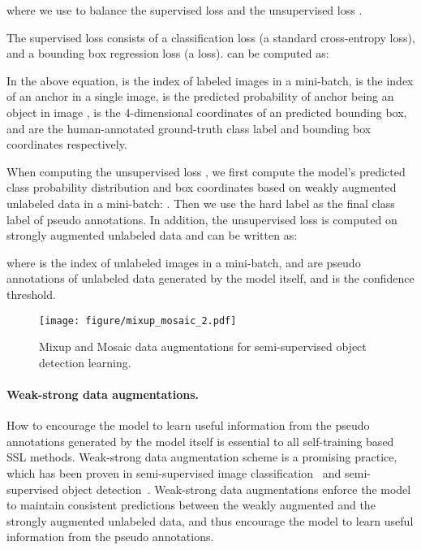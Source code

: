 \documentclass[final]{cvpr}
\begin{document}
where we use  to balance the supervised loss  and the unsupervised loss .

The supervised loss  consists of a classification loss  (a standard cross-entropy loss), and a bounding box regression loss  (a  loss).  can be computed as:

In the above equation,  is the index of labeled images in a mini-batch,  is the index of an anchor in a single image,  is the predicted probability of anchor  being an object in image ,  is the 4-dimensional coordinates of an predicted bounding box,  and  are the human-annotated ground-truth class label and bounding box coordinates respectively.

When computing the unsupervised loss , we first compute the model's predicted class probability distribution and box coordinates based on weakly augmented unlabeled data in a mini-batch: . Then we use the hard label  as the final class label of pseudo annotations. In addition, the unsupervised loss is computed on strongly augmented unlabeled data and can be written as:

where  is the index of unlabeled images in a mini-batch,  and  are pseudo annotations of unlabeled data generated by the model itself, and  is the confidence threshold.



\begin{figure}[t!]
	\begin{center}
	\texttt{[image: figure/mixup\_mosaic\_2.pdf]}
	\end{center}
	\vspace{-.15in}
	\caption{Mixup and Mosaic data augmentations for semi-supervised object detection learning.}
	\label{fig:instance_mixup}
	\vspace{-.2in}
\end{figure}

\paragraph{Weak-strong data augmentations.} How to encourage the model to learn useful information from the pseudo annotations generated by the model itself is essential to all self-training based SSL methods. Weak-strong data augmentation scheme is a promising practice, which has been proven in semi-supervised image classification~\cite{sohn2020fixmatch} and semi-supervised object detection~\cite{sohn2020simple}. Weak-strong data augmentations enforce the model to maintain consistent predictions between the weakly augmented and the strongly augmented unlabeled data, and thus encourage the model to learn useful information from the pseudo annotations.
\end{document}
